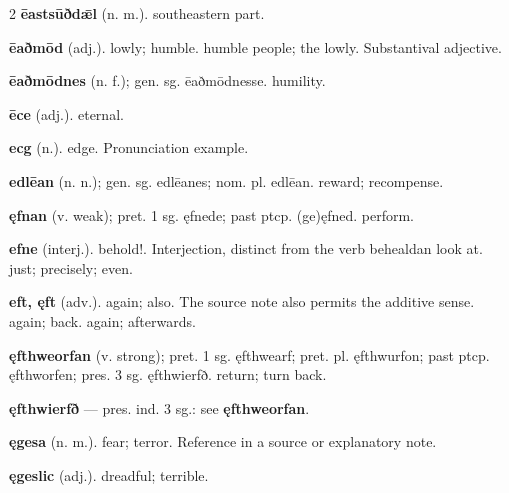 \begin{multicols*}{2}
\textbf{ēastsūðdǣl} (n. m.). southeastern part.\par
\textbf{ēaðmōd} (adj.). lowly; humble. humble people; the lowly. Substantival adjective.\par
\textbf{ēaðmōdnes} (n. f.); gen. sg. ēaðmōdnesse. humility.\par
\textbf{ēce} (adj.). eternal.\par
\textbf{ecg} (n.). edge. Pronunciation example.\par
\textbf{edlēan} (n. n.); gen. sg. edlēanes; nom. pl. edlēan. reward; recompense.\par
\textbf{ęfnan} (v. weak); pret. 1 sg. ęfnede; past ptcp. (ge)ęfned. perform.\par
\textbf{efne} (interj.). behold!. Interjection, distinct from the verb behealdan look at. just; precisely; even.\par
\textbf{eft, ęft} (adv.). again; also. The source note also permits the additive sense. again; back. again; afterwards.\par
\textbf{ęfthweorfan} (v. strong); pret. 1 sg. ęfthwearf; pret. pl. ęfthwurfon; past ptcp. ęfthworfen; pres. 3 sg. ęfthwierfð. return; turn back.\par
\textbf{ęfthwierfð} — pres. ind. 3 sg.: see \textbf{ęfthweorfan}.\par
\textbf{ęgesa} (n. m.). fear; terror. Reference in a source or explanatory note.\par
\textbf{ęgeslic} (adj.). dreadful; terrible.\par

\end{multicols*}
